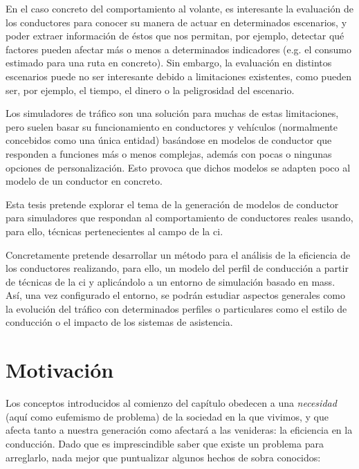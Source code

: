En el caso concreto del comportamiento al volante, es interesante la evaluación de los conductores para conocer su manera de actuar en determinados escenarios, y poder extraer información de éstos que nos permitan, por ejemplo, detectar qué factores pueden afectar más o menos a determinados indicadores (e.g. el consumo estimado para una ruta en concreto). Sin embargo, la evaluación en distintos escenarios puede no ser interesante debido a limitaciones existentes, como pueden ser, por ejemplo, el tiempo, el dinero o la peligrosidad del escenario.

Los simuladores de tráfico son una solución para muchas de estas limitaciones, pero suelen basar su funcionamiento en conductores y vehículos (normalmente concebidos como una única entidad) basándose en modelos de conductor que responden a funciones más o menos complejas, además con pocas o ningunas opciones de personalización. Esto provoca que dichos modelos se adapten poco al modelo de un conductor en concreto.

Esta tesis pretende explorar el tema de la generación de modelos de conductor para simuladores que respondan al comportamiento de conductores reales usando, para ello, técnicas pertenecientes al campo de la \ac{ci}.

Concretamente pretende desarrollar un método para el análisis de la eficiencia de los conductores realizando, para ello, un modelo del perfil de conducción a partir de técnicas de la \ac{ci} y aplicándolo a un entorno de simulación basado en \Acp{mas}. Así, una vez configurado el entorno, se podrán estudiar aspectos generales como la evolución del tráfico con determinados perfiles o particulares como el estilo de conducción o el impacto de los sistemas de asistencia.


\section{Motivación}

Los conceptos introducidos al comienzo del capítulo obedecen a una \textit{necesidad} (aquí como eufemismo de problema) de la sociedad en la que vivimos, y que afecta tanto a nuestra generación como afectará a las venideras: la eficiencia en la conducción. Dado que es imprescindible saber que existe un problema para arreglarlo, nada mejor que puntualizar algunos hechos de sobra conocidos:

